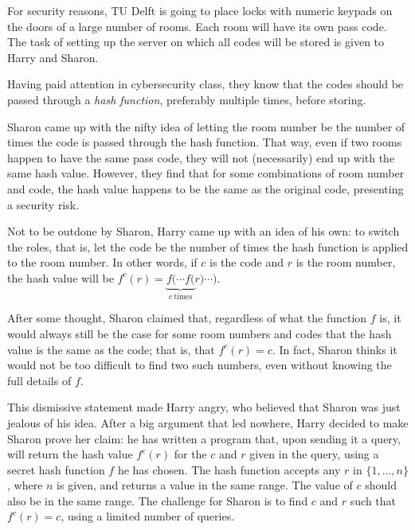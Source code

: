 \problemname{}


\newcommand{\maxn}{2\cdot 10^5}
\newcommand{\maxq}{1000}

For security reasons, TU Delft is going to place locks with numeric keypads on the doors of a large number of rooms. Each room will have its own pass code. The task of setting up the server on which all codes will be stored is given to Harry and Sharon.

Having paid attention in cybersecurity class, they know that the codes should be passed through a \emph{hash function}, preferably multiple times, before storing.

Sharon came up with the nifty idea of letting the room number be the number of times the code is passed through the hash function. That way, even if two rooms happen to have the same pass code, they will not (necessarily) end up with the same hash value. However, they find that for some combinations of room number and code, the hash value happens to be the same as the original code, presenting a security risk.

Not to be outdone by Sharon, Harry came up with an idea of his own: to switch the roles, that is, let the code be the number of times the hash function is applied to the room number. In other words, if $c$ is the code and $r$ is the room number, the hash value will be $f^c(r) = \underbrace{f(\cdots f(}_{c~\mathrm{times}}r)\cdots)$.

After some thought, Sharon claimed that, regardless of what the function $f$ is, it would always still be the case for some room numbers and codes that the hash value is the same as the code; that is, that $f^c(r) = c$. In fact, Sharon thinks it would not be too difficult to find two such numbers, even without knowing the full details of $f$.

This dismissive statement made Harry angry, who believed that Sharon was just jealous of his idea. After a big argument that led nowhere, Harry decided to make Sharon prove her claim: he has written a program that, upon sending it a query, will return the hash value $f^c(r)$ for the $c$ and $r$ given in the query, using a secret hash function $f$ he has chosen. The hash function accepts any $r$ in $\{1,\dots,n\}$, where $n$ is given, and returns a value in the same range. The value of $c$ should also be in the same range. The challenge for Sharon is to find $c$ and $r$ such that $f^c(r) = c$, using a limited number of queries.

